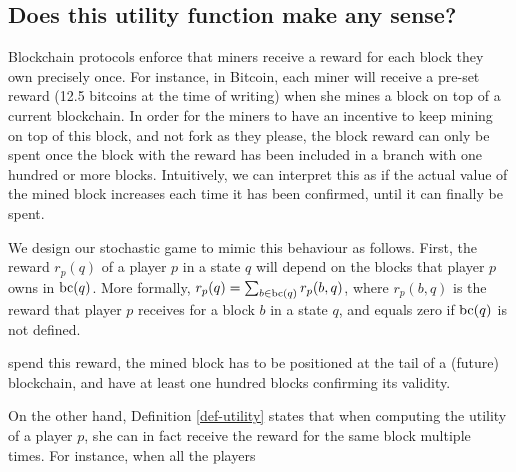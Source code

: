 \subsection{Does this utility function make any sense?}\label{sec-wtf}

Blockchain protocols enforce that miners receive a reward for each block they own precisely once. For instance, in Bitcoin, each miner will receive a pre-set reward (12.5 bitcoins at the time of writing) when she mines a block on top of a current blockchain. In order for the miners to have an incentive to keep mining on top of this block, and not fork as they please, the block reward can only be spent once the block with the reward has been included in a branch with one hundred or more blocks. Intuitively, we can interpret this as if the actual value of the mined block increases each time it has been confirmed, until it can finally be spent.

We design our stochastic game to mimic this behaviour as follows. First, the reward $r_p(q)$ of a player $p$ in a state $q$ will depend on the blocks that player $p$ owns in $\text{bc}(q)$. More formally, $r_p(q)= \sum_{b \in \text{bc}(q)} r_p(b,q)$, where $r_p(b,q)$ is the reward that player $p$ receives for a block $b$ in a state $q$, and equals zero if $\text{bc}(q)$ is not defined.





spend this reward, the mined block has to be positioned at the tail of a (future) blockchain, and have at least one hundred blocks confirming its validity. 



On the other hand, Definition \ref{def-utility} states that when computing the utility of a player $p$, she can in fact receive the reward for the same block multiple times. For instance, when all the players 